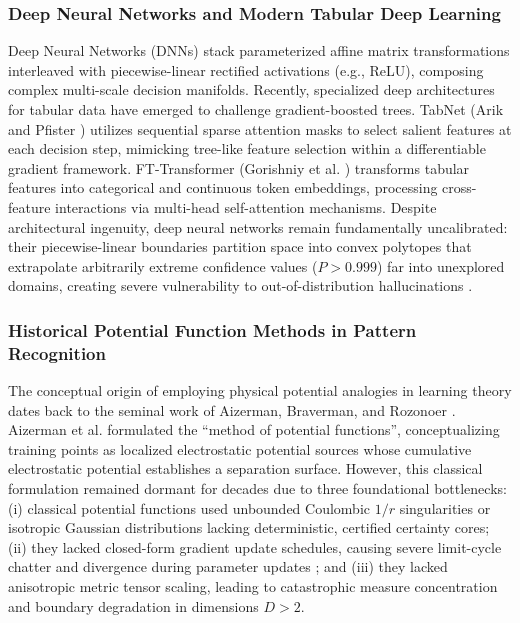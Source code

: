 \documentclass[preprint,review,12pt]{elsarticle}
\begin{document}
\subsubsection{Deep Neural Networks and Modern Tabular Deep Learning}
Deep Neural Networks (DNNs) \cite{lecun2015deep} stack parameterized affine matrix transformations interleaved with piecewise-linear rectified activations (e.g., ReLU), composing complex multi-scale decision manifolds. Recently, specialized deep architectures for tabular data have emerged to challenge gradient-boosted trees. TabNet (Arik and Pfister \cite{arik2021tabnet}) utilizes sequential sparse attention masks to select salient features at each decision step, mimicking tree-like feature selection within a differentiable gradient framework. FT-Transformer (Gorishniy et al. \cite{gorishniy2021revisiting}) transforms tabular features into categorical and continuous token embeddings, processing cross-feature interactions via multi-head self-attention mechanisms. Despite architectural ingenuity, deep neural networks remain fundamentally uncalibrated: their piecewise-linear boundaries partition space into convex polytopes that extrapolate arbitrarily extreme confidence values ($P > 0.999$) far into unexplored domains, creating severe vulnerability to out-of-distribution hallucinations \cite{goodfellow2014explaining}.

\subsubsection{Historical Potential Function Methods in Pattern Recognition}
The conceptual origin of employing physical potential analogies in learning theory dates back to the seminal work of Aizerman, Braverman, and Rozonoer \cite{aizerman1964theoretical}. Aizerman et al. formulated the ``method of potential functions'', conceptualizing training points as localized electrostatic potential sources whose cumulative electrostatic potential establishes a separation surface. However, this classical formulation remained dormant for decades due to three foundational bottlenecks: (i) classical potential functions used unbounded Coulombic $1/r$ singularities or isotropic Gaussian distributions lacking deterministic, certified certainty cores; (ii) they lacked closed-form gradient update schedules, causing severe limit-cycle chatter and divergence during parameter updates \cite{robbins1951stochastic}; and (iii) they lacked anisotropic metric tensor scaling, leading to catastrophic measure concentration and boundary degradation in dimensions $D > 2$.
\end{document}

